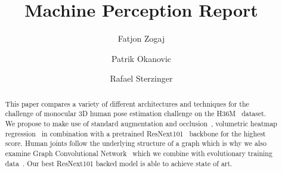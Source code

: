 \documentclass[sigconf]{acmart}
\begin{document}
\title{Machine Perception Report}

\author{Fatjon Zogaj}\affiliation{}

\author{Patrik Okanovic}\affiliation{}

\author{Rafael Sterzinger}\affiliation{}

\begin{abstract}
    This paper compares a variety of different architectures and techniques
    for the challenge of monocular 3D human pose estimation challenge on the H36M~\cite{h36m_pami} dataset.
    We propose to make use of standard augmentation and occlusion~\cite{sarandi_synthetic_2018},
    volumetric heatmap regression~\cite{sun_integral_2018-1} in combination with a pretrained ResNext101~\cite{DBLP:journals/corr/XieGDTH16}
    backbone for the highest score.
    Human joints follow the underlying structure
    of a graph which is why we also examine Graph Convolutional Network~\cite{zhao2019gcn}
    which we combine with evolutionary training data~\cite{Li_2020_CVPR}.
    Our best ResNext101 backed model is able to achieve state of art.
\end{abstract}

\maketitle





\end{document}
